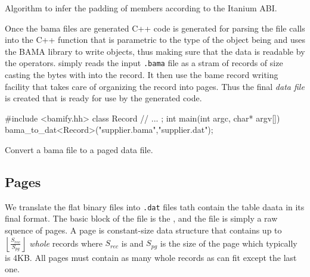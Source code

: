 \begin{code}
  \caption{\label{lst:record_byte_padding}Algorithm to infer the
    padding of members according to the Itanium ABI.}
\end{code}


Once the bama files are generated C++ code is generated for parsing
the file calls into the C++ function  that is parametric
to the type of the object being and uses the BAMA library to write
objects, thus making sure that the data is readable by the
operators.  simply reads the input \texttt{.bama} file as a
stram of records of size  casting the bytes with
 into the record. It then use the bame
record writing facility  that takes care of
organizing the record into pages. Thus the final \emph{data file} is
created that is ready for use by the generated code.

\begin{code}
\begin{cppcode}
#include <bamify.hh>
class Record {
  // ...
};
int main(int argc, char* argv[]) {
  bama_to_dat<Record>("supplier.bama","supplier.dat");
}
\end{cppcode}
  \caption{Convert a bama file to a paged data file.}
\end{code}

\subsection{Pages}

We translate the flat binary files into \texttt{.dat} files tath
contain the table daata in its final format. The basic block of the
file is the , and the file is simply a raw squence of
pages. A page is constant-size data structure that contains up to
\(\left\lfloor\frac{S_{rec}}{S_{pg}} \right\rfloor\) \emph{whole}
records where \(S_{rec}\) is  and \(S_{pg}\) is
the size of the page which typically is 4KB. All pages must contain as
many whole records as can fit except the last one.

